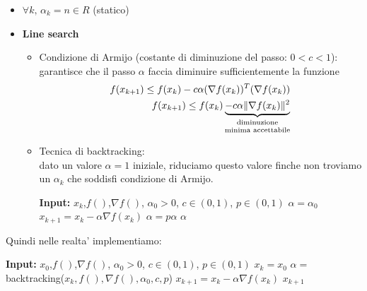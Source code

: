 \documentclass[a4paper,12pt]{article}
\begin{document}
\begin{itemize}
    \item $\forall k, \, \alpha_k = n \in R$ (statico)
    \item \textbf{Line search}
    \begin{itemize}
        \item Condizione di Armijo (costante di diminuzione del passo: $0<c<1$): \\
        \vspace{2em} garantisce che il passo $\alpha$ faccia diminuire sufficientemente la funzione
        \begin{align*}
            f(x_{k+1}) \leq f(x_k) - c \alpha (\nabla f(x_k))^T (\nabla f(x_k)) \\
            f(x_{k+1}) \leq f(x_k) \underbrace{- c \alpha \|\nabla f(x_k)\|^2}_{\text{\shortstack{diminuzione \\ minima accettabile}}}
        \end{align*}
        \item Tecnica di backtracking: \\
        dato un valore $\alpha = 1$ iniziale, riduciamo questo valore finche non troviamo un $\alpha_k$ che soddisfi condizione di Armijo.
            \begin{algorithm}[H]
            \caption{Tecnica di backtracking}
            \begin{algorithmic}[1]
            \State \textbf{Input:} $x_k$,$f()$,$\nabla f()$, $\alpha_0 > 0$, $c \in (0,1)$, $p \in (0,1)$
            \State $\alpha = \alpha_0$
            \Repeat
                \State $x_{k+1} = x_k - \alpha \nabla f(x_k)$
                    \State $\alpha = p \alpha$
                \EndIf
            \State \Return $\alpha$
            \end{algorithmic}
            \end{algorithm}

    \end{itemize}
\end{itemize}
Quindi nelle realta' implementiamo:
            \begin{algorithm}[H]
            \caption{Metodo del gradiente}
            \begin{algorithmic}[1]
            \State \textbf{Input:} $x_0$,$f()$,$\nabla f()$, $\alpha_0 > 0$, $c \in (0,1)$, $p \in (0,1)$
            \State $x_k = x_0$
                \State $\alpha = $ backtracking($x_k, f(), \nabla f(), \alpha_0, c, p$)
                \State $x_{k+1} = x_k - \alpha \nabla f(x_k)$
            \EndFor
            \State \Return $x_{k+1}$
            \end{algorithmic}
            \end{algorithm}
\end{document}
